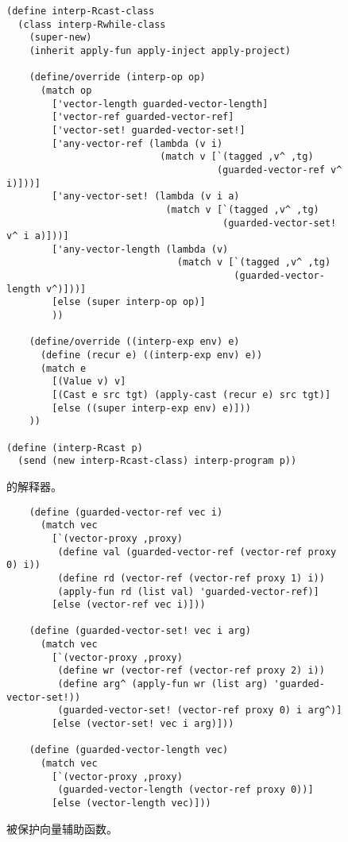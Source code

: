 \documentclass[11pt]{book}
\begin{document}
\begin{figure}[tbp]
\begin{lstlisting}
(define interp-Rcast-class
  (class interp-Rwhile-class
    (super-new)
    (inherit apply-fun apply-inject apply-project)

    (define/override (interp-op op)
      (match op
        ['vector-length guarded-vector-length]
        ['vector-ref guarded-vector-ref]
        ['vector-set! guarded-vector-set!]
        ['any-vector-ref (lambda (v i)
                           (match v [`(tagged ,v^ ,tg)
                                     (guarded-vector-ref v^ i)]))]
        ['any-vector-set! (lambda (v i a)
                            (match v [`(tagged ,v^ ,tg)
                                      (guarded-vector-set! v^ i a)]))]
        ['any-vector-length (lambda (v)
                              (match v [`(tagged ,v^ ,tg)
                                        (guarded-vector-length v^)]))]
        [else (super interp-op op)]
        ))

    (define/override ((interp-exp env) e)
      (define (recur e) ((interp-exp env) e))
      (match e
        [(Value v) v]
        [(Cast e src tgt) (apply-cast (recur e) src tgt)]
        [else ((super interp-exp env) e)]))
    ))

(define (interp-Rcast p)
  (send (new interp-Rcast-class) interp-program p))
\end{lstlisting}
\caption{ \LangCast{} 的解释器。}
  \label{fig:interp-Rcast}
\end{figure}


\begin{figure}[tbp]
\begin{lstlisting}
    (define (guarded-vector-ref vec i)
      (match vec
        [`(vector-proxy ,proxy)
         (define val (guarded-vector-ref (vector-ref proxy 0) i))
         (define rd (vector-ref (vector-ref proxy 1) i))
         (apply-fun rd (list val) 'guarded-vector-ref)]
        [else (vector-ref vec i)]))
        
    (define (guarded-vector-set! vec i arg)
      (match vec
        [`(vector-proxy ,proxy)
         (define wr (vector-ref (vector-ref proxy 2) i))
         (define arg^ (apply-fun wr (list arg) 'guarded-vector-set!))
         (guarded-vector-set! (vector-ref proxy 0) i arg^)]
        [else (vector-set! vec i arg)]))
        
    (define (guarded-vector-length vec)
      (match vec
        [`(vector-proxy ,proxy)
         (guarded-vector-length (vector-ref proxy 0))]
        [else (vector-length vec)]))
\end{lstlisting}
\caption{被保护向量辅助函数。}
  \label{fig:guarded-vector}
\end{figure}
\end{document}
